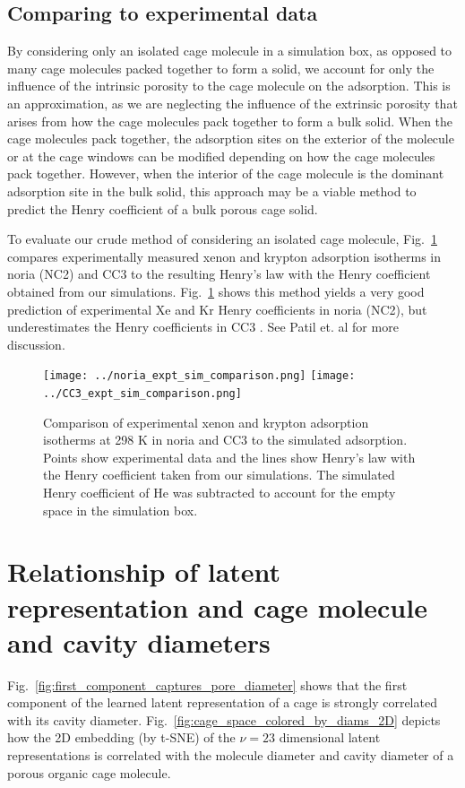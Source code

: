 \documentclass[journal=jacsat,manuscript=article]{achemso}
\begin{document}
\subsection{Comparing to experimental data}
By considering only an isolated cage molecule in a simulation box, as opposed to many cage molecules packed together to form a solid, we account for only the influence of the intrinsic porosity to the cage molecule on the adsorption. This is an approximation, as we are neglecting the influence of the extrinsic porosity that arises from how the cage molecules pack together to form a bulk solid. When the cage molecules pack together, the adsorption sites on the exterior of the molecule or at the cage windows can be modified depending on how the cage molecules pack together. However, when the interior of the cage molecule is the dominant adsorption site in the bulk solid, this approach may be a viable method to predict the Henry coefficient of a bulk porous cage solid.

To evaluate our crude method of considering an isolated cage molecule, Fig.~\ref{fig:expt_sim_compare} compares experimentally measured xenon and krypton adsorption isotherms in noria \cite{patil2016noria} (NC2) and CC3 \cite{chen2014separation} to the resulting Henry's law with the Henry coefficient obtained from our simulations. Fig.~\ref{fig:expt_sim_compare} shows this method yields a very good prediction of experimental Xe and Kr Henry coefficients in noria \cite{patil2016noria} (NC2), but underestimates the Henry coefficients in CC3 \cite{chen2014separation}. See Patil et. al \cite{patil2016noria} for more discussion.

\begin{figure}
\centering
	\texttt{[image: ../noria\_expt\_sim\_comparison.png]}
	\texttt{[image: ../CC3\_expt\_sim\_comparison.png]}
	\caption{Comparison of experimental xenon and krypton adsorption isotherms at 298 K in noria \cite{patil2016noria} and CC3 \cite{chen2014separation} to the simulated adsorption. Points show experimental data and the lines show Henry's law with the Henry coefficient taken from our simulations. The simulated Henry coefficient of He was subtracted to account for the empty space in the simulation box.
	} \label{fig:expt_sim_compare}
\end{figure}

\newpage
\clearpage

\section{Relationship of latent representation and cage molecule and cavity diameters}
Fig.~\ref{fig:first_component_captures_pore_diameter} shows that the first component of the learned latent representation of a cage is strongly correlated with its cavity diameter. 
Fig.~\ref{fig:cage_space_colored_by_diams_2D} depicts how the 2D embedding (by t-SNE) of the $\nu=23$ dimensional latent representations is correlated with the molecule diameter and cavity diameter of a porous organic cage molecule.
\end{document}
